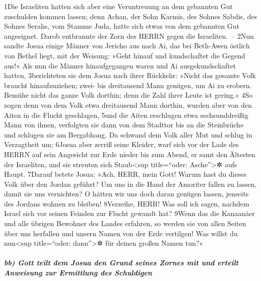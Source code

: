 1Die Israeliten hatten sich aber eine Veruntreuung an dem gebannten Gut
zuschulden kommen lassen; denn Achan, der Sohn Karmis, des Sohnes
Sabdis, des Sohnes Serahs, vom Stamme Juda, hatte sich etwas von dem
gebannten Gut angeeignet. Darob entbrannte der Zorn des HERRN gegen die
Israeliten.~-- 2Nun sandte Josua einige Männer von Jericho aus nach Ai,
das bei Beth-Awen östlich von Bethel liegt, mit der Weisung: »Geht
hinauf und kundschaftet die Gegend aus!« Als nun die Männer
hinaufgegangen waren und Ai ausgekundschaftet hatten, 3berichteten sie
dem Josua nach ihrer Rückkehr: »Nicht das gesamte Volk braucht
hinaufzuziehen; zwei- bis dreitausend Mann genügen, um Ai zu erobern.
Bemühe nicht das ganze Volk dorthin; denn die Zahl ihrer Leute ist
gering.« 4So zogen denn von dem Volk etwa dreitausend Mann dorthin,
wurden aber von den Aiten in die Flucht geschlagen, 5und die Aiten
erschlugen etwa sechsunddreißig Mann von ihnen, verfolgten sie dann von
dem Stadttor bis an die Steinbrüche und schlugen sie am Bergabhang. Da
schwand dem Volk aller Mut und schlug in Verzagtheit um; 6Josua aber
zerriß seine Kleider, warf sich vor der Lade des HERRN auf sein
Angesicht zur Erde nieder bis zum Abend, er samt den Ältesten der
Israeliten, und sie streuten sich Staub\textless sup title=``oder:
Asche''\textgreater✲ aufs Haupt. 7Darauf betete Josua: »Ach, HERR, mein
Gott! Warum hast du dieses Volk über den Jordan geführt? Um uns in die
Hand der Amoriter fallen zu lassen, damit sie uns vernichten? O hätten
wir uns doch daran genügen lassen, jenseits des Jordans wohnen zu
bleiben! 8Verzeihe, HERR! Was soll ich sagen, nachdem Israel sich vor
seinen Feinden zur Flucht gewandt hat? 9Wenn das die Kanaanäer und alle
übrigen Bewohner des Landes erfahren, so werden sie von allen Seiten
über uns herfallen und unsern Namen von der Erde vertilgen! Was willst
du nun\textless sup title=``oder: dann''\textgreater✲ für deinen großen
Namen tun?«

\hypertarget{bb-gott-teilt-dem-josua-den-grund-seines-zornes-mit-und-erteilt-anweisung-zur-ermittlung-des-schuldigen}{%
\subparagraph{bb) Gott teilt dem Josua den Grund seines Zornes mit und
erteilt Anweisung zur Ermittlung des
Schuldigen}\label{bb-gott-teilt-dem-josua-den-grund-seines-zornes-mit-und-erteilt-anweisung-zur-ermittlung-des-schuldigen}}

